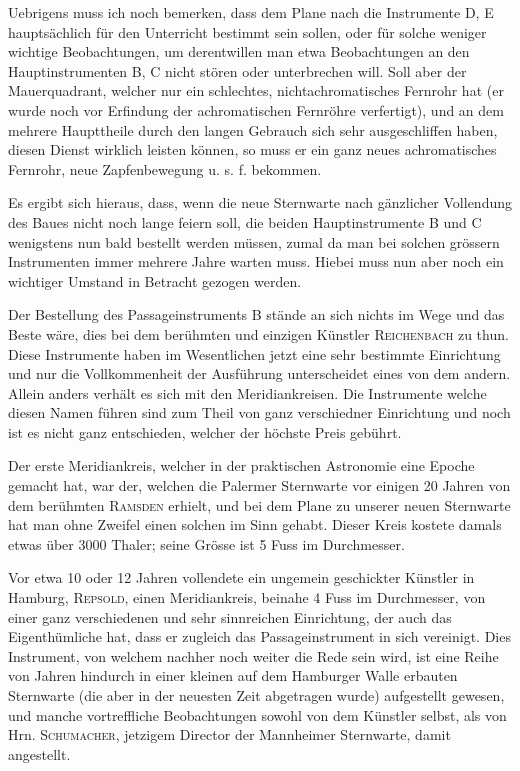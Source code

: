 Uebrigens muss ich noch bemerken, dass dem Plane nach die Instrumente D, E hauptsächlich für den Unterricht bestimmt sein sollen, oder für solche weniger wichtige Beobachtungen, um derentwillen man etwa Beobachtungen an den Hauptinstrumenten B, C nicht stören oder unterbrechen will. Soll aber der Mauerquadrant, welcher nur ein schlechtes, nichtachromatisches Fernrohr hat (er wurde noch vor Erfindung der achromatischen Fernröhre verfertigt), und an dem mehrere Haupttheile durch den langen Gebrauch sich sehr ausgeschliffen haben, diesen Dienst wirklich leisten können, so muss er ein ganz neues achromatisches Fernrohr, neue Zapfenbewegung u. s. f. bekommen.

Es ergibt sich hieraus, dass, wenn die neue Sternwarte nach gänzlicher Vollendung des Baues nicht noch lange feiern soll, die beiden Hauptinstrumente B und C wenigstens nun bald bestellt werden müssen, zumal da man bei solchen grössern Instrumenten immer mehrere Jahre warten muss. Hiebei muss nun aber noch ein wichtiger Umstand in Betracht gezogen werden.

Der Bestellung des Passageinstruments B stände an sich nichts im Wege und das Beste wäre, dies bei dem berühmten und einzigen Künstler \textsc{Reichenbach} zu thun. Diese Instrumente haben im Wesentlichen jetzt eine sehr bestimmte Einrichtung und nur die Vollkommenheit der Ausführung unterscheidet eines von dem andern. Allein anders verhält es sich mit den Meridiankreisen. Die Instrumente welche diesen Namen führen sind zum Theil von ganz
\clearpage{}
\noindent verschiedner Einrichtung und noch ist es nicht ganz entschieden, welcher der höchste Preis gebührt.

Der erste Meridiankreis, welcher in der praktischen Astronomie eine Epoche gemacht hat, war der, welchen die Palermer Sternwarte vor einigen 20 Jahren von dem berühmten \textsc{Ramsden} erhielt, und bei dem Plane zu unserer neuen Sternwarte hat man ohne Zweifel einen solchen im Sinn gehabt. Dieser Kreis kostete damals etwas über 3000 Thaler; seine Grösse ist 5 Fuss im Durchmesser.

Vor etwa 10 oder 12 Jahren vollendete ein ungemein geschickter Künstler in Hamburg, \textsc{Repsold}, einen Meridiankreis, beinahe 4 Fuss im Durchmesser, von einer ganz verschiedenen und sehr sinnreichen Einrichtung, der auch das Eigenthümliche hat, dass er zugleich das Passageinstrument in sich vereinigt. Dies Instrument, von welchem nachher noch weiter die Rede sein wird, ist eine Reihe von Jahren hindurch in einer kleinen auf dem Hamburger Walle erbauten Sternwarte (die aber in der neuesten Zeit abgetragen wurde) aufgestellt gewesen, und manche vortreffliche Beobachtungen sowohl von dem Künstler selbst, als von Hrn. \textsc{Schumacher}, jetzigem Director der Mannheimer Sternwarte, damit angestellt.

